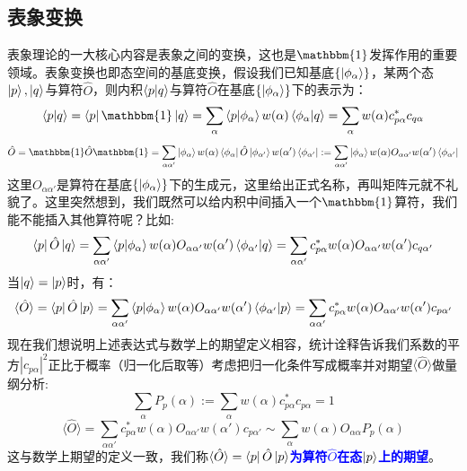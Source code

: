\subsection{表象变换}
表象理论的一大核心内容是表象之间的变换，这也是$\mathbbm{1}$发挥作用的重要领域。表象变换也即态空间的基底变换，假设我们已知基底$\{\ket{\phi_{\alpha}}\}$，某两个态$\ket{p},\ket{q}$与算符$\hat{O}$，则内积$\bra{p}\ket{q}$与算符$\hat{O}$在基底$\{\ket{\phi_{\alpha}}\}$下的表示为：
\[\bra{p}\ket{q}=\bra{p}\mathbbm{1}\ket{q}=\sum_{\alpha}\bra{p}\ket{\phi_{\alpha}}w(\alpha)\bra{\phi_{\alpha}}\ket{q}=\sum_{\alpha}w(\alpha)c_{p\alpha}^*c_{q\alpha}\]
\begin{equation}\label{eq:operator_qm}
\hat{O}=\mathbbm{1}\hat{O}\mathbbm{1}=\sum_{\alpha\alpha'}\ket{\phi_{\alpha}}w(\alpha)\bra{\phi_{\alpha}}\hat{O}\ket{\phi_{\alpha'}}w(\alpha')\bra{\phi_{\alpha'}}:=\sum_{\alpha\alpha'}\ket{\phi_{\alpha}}w(\alpha)O_{\alpha\alpha'}w(\alpha')\bra{\phi_{\alpha'}}
\end{equation}
这里$O_{\alpha\alpha'}$是算符在基底$\{\ket{\phi_{\alpha}}\}$下的生成元，这里给出正式名称，再叫矩阵元就不礼貌了。这里突然想到，我们既然可以给内积中间插入一个$\mathbbm{1}$算符，我们能不能插入其他算符呢？比如:
\[\bra{p}\hat{O}\ket{q}=\sum_{\alpha\alpha'}\bra{p}\ket{\phi_{\alpha}}w(\alpha)O_{\alpha\alpha'}w(\alpha')\bra{\phi_{\alpha'}}\ket{q}=\sum_{\alpha\alpha'}c_{p\alpha}^*w(\alpha)O_{\alpha\alpha'}w(\alpha')c_{q\alpha'}\]
当$\ket{q}=\ket{p}$时，有：
\[\langle\hat{O}\rangle=\bra{p}\hat{O}\ket{p}=\sum_{\alpha\alpha'}\bra{p}\ket{\phi_{\alpha}}w(\alpha)O_{\alpha\alpha'}w(\alpha')\bra{\phi_{\alpha'}}\ket{p}=\sum_{\alpha\alpha'}c_{p\alpha}^*w(\alpha)O_{\alpha\alpha'}w(\alpha')c_{p\alpha'}\]
现在我们想说明上述表达式与数学上的期望定义相容，统计诠释告诉我们系数的平方$|c_{p\alpha}|^2$正比于概率（归一化后取等）考虑把归一化条件写成概率并对期望$\langle\hat{O}\rangle$做量纲分析:
\[\sum_{\alpha}P_p(\alpha):=\sum_{\alpha}w(\alpha)c_{p\alpha}^*c_{p\alpha}=1\]
\[\langle\hat{O}\rangle=\sum_{\alpha\alpha'}c_{p\alpha}^*w(\alpha)O_{\alpha\alpha'}w(\alpha')c_{p\alpha'}\sim\sum_{\alpha}w(\alpha)O_{\alpha\alpha}P_p(\alpha)\]
这与数学上期望的定义一致，我们称\textcolor{blue}{\textbf{$\langle\hat{O}\rangle=\bra{p}\hat{O}\ket{p}$为算符$\hat{O}$在态$\ket{p}$上的期望}}。

